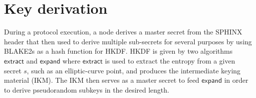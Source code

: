 \begin{comment}


\section{Appendix}
\vspace{1cm}
\begin{tabular}{ c | c | c | c | c}
    Name        & Definition & DataType & Size in bytes & usage \\ \hline
    Recipient   &            & address  &               &       \\
    Amount      &            & uint256  &               &       \\
    TicketIndex &            & uint256  &               &       \\
    Iteration   &            & uint256  &               &       \\
    WinProb     &            & uint256  &               &       \\
    Epoch       &            & uint256  &               &       \\
    Challenge   &            & bytes32  &               &       \\
    ChainId     &            & uint8    & 1             &       \\
    Version     &            & uint8    & 1             &       \\
    Tag         &            & uint8    & 1             &       \\
    SignatureX  &            & bytes32  & 32            &       \\
    SignatureY  &            & bytes32  & 32            &
\end{tabular}
\end{comment}

\section{Key derivation}
\label{sec:keyderivation}

During a protocol execution, a node derives a master secret from the SPHINX header that then used to derive multiple sub-secrets for several purposes by using BLAKE2s as a hash function for HKDF. HKDF is given by two algorithms $\mathsf{extract}$ and $\mathsf{expand}$ where $\mathsf{extract}$ is used to extract the entropy from a given secret $s$, such as an elliptic-curve point, and produces the intermediate keying material (IKM). The IKM then serves as a master secret to feed $\mathsf{expand}$ in order to derive pseudorandom subkeys in the desired length.

